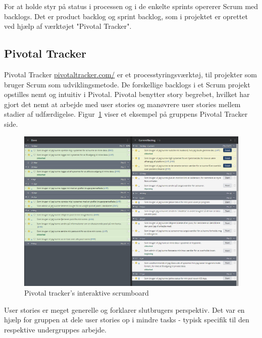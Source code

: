 For at holde styr på status i processen og i de enkelte sprints opererer Scrum med backlogs. Det er product backlog og sprint backlog, som i projektet er oprettet ved hjælp af værktøjet "Pivotal Tracker". 

\subsection{Pivotal Tracker}
Pivotal Tracker \url{pivotaltracker.com/} er et processtyringsværktøj, til projekter som bruger Scrum som udviklingsmetode. De forskellige backlogs i et Scrum projekt opstilles nemt og intuitiv i Pivotal. Pivotal benytter story begrebet, hvilket har gjort det nemt at arbejde med user stories og manøvrere user stories mellem stadier af udfærdigelse. Figur~\ref{fig:scrumboard} viser et eksempel på gruppens Pivotal Tracker side.

\begin{figure}
	\centering
	\includegraphics[width=\linewidth]{figs/processProjektGennemforsel/scrumboard.PNG}
	\caption{Pivotal tracker's interaktive scrumboard}
	\label{fig:scrumboard}
\end{figure}

 User stories er meget generelle og forklarer slutbrugers perspektiv. Det var en hjælp for gruppen at dele user stories op i mindre tasks - typisk specifik til den respektive undergruppes arbejde. 
%

